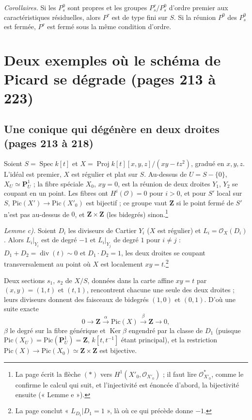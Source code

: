 \documentclass[11pt,a4paper]{article}
\begin{document}
\emph{Corollaires.} Si les $P^0_s$ sont propres et les groupes
$P^\tau_s/P^0_s$ d'ordre premier aux caractéristiques résiduelles, alors
$P^\tau$ est de type fini sur $S$. Si la réunion $P^0$ des $P^0_s$ est fermée,
$P^\tau$ est fermé sous la même condition d'ordre.

\section*{Deux exemples où le schéma de Picard se dégrade (pages 213 à 223)}

\subsection*{Une conique qui dégénère en deux droites (pages 213 à 218)}

Soient $S = \operatorname{Spec} k[t]$ et
$X = \operatorname{Proj} k[t][x, y, z]/(xy - tz^2)$, gradué en $x, y, z$.
L'idéal est premier, $X$ est régulier et plat sur $S$. Au-dessus de
$U = S - \{0\}$, $X_U \simeq \mathbf{P}^1_U$ ; la fibre spéciale $X_0$,
$xy = 0$, est la réunion de deux droites $Y_1$, $Y_2$ se coupant en un point. Les
fibres ont $H^i(\mathcal{O}) = 0$ pour $i > 0$, et pour $S'$ local sur $S$,
$\mathrm{Pic}(X') \to \mathrm{Pic}(X'_0)$ est bijectif ; ce groupe vaut
$\mathbf{Z}$ si le point fermé de $S'$ n'est pas au-dessus de $0$, et
$\mathbf{Z} \times \mathbf{Z}$ (les bidegrés) sinon.\footnote{La page écrit
la flèche $(*)$ vers $H^1(X'_0, \mathcal{O}_{X'_0})$ ; il faut lire
$\mathcal{O}^*_{X'_0}$, comme le confirme le calcul qui suit, et
l'injectivité est énoncée d'abord, la bijectivité ensuite (« Lemme e »).}

\emph{Lemme c).} Soient $D_i$ les diviseurs de Cartier $Y_i$ ($X$ est régulier)
et $L_i = \mathcal{O}_X(D_i)$. Alors $L_i|_{Y_i}$ est de degré $-1$ et
$L_i|_{Y_j}$ de degré $1$ pour $i \neq j$ : $D_1 + D_2 = \operatorname{div}(t) \sim 0$
et $D_1 \cdot D_2 = 1$, les deux droites se coupant transversalement au point où
$X$ est localement $xy = t$.\footnote{La page conclut « $L_{D_1}|D_1 = 1$ », là
où ce qui précède donne $-1$.}

Deux sections $s_1$, $s_2$ de $X/S$, données dans la carte affine
$xy = t$ par $(x, y) = (1, t)$ et $(t, 1)$, rencontrent chacune une seule des
deux droites ; leurs diviseurs donnent des faisceaux de bidegrés $(1, 0)$ et
$(0, 1)$. D'où une suite exacte
\[
0 \to \mathbf{Z} \xrightarrow{\ \alpha\ } \mathrm{Pic}(X) \xrightarrow{\ \beta\ } \mathbf{Z} \to 0 ,
\]
$\beta$ le degré sur la fibre générique et $\operatorname{Ker}\beta$ engendré
par la classe de $D_1$ (puisque $\mathrm{Pic}(X_U) = \mathrm{Pic}(\mathbf{P}^1_U) = \mathbf{Z}$,
$k[t, t^{-1}]$ étant principal), et la restriction
$\mathrm{Pic}(X) \to \mathrm{Pic}(X_0) \simeq \mathbf{Z} \times \mathbf{Z}$ est
bijective.
\end{document}
